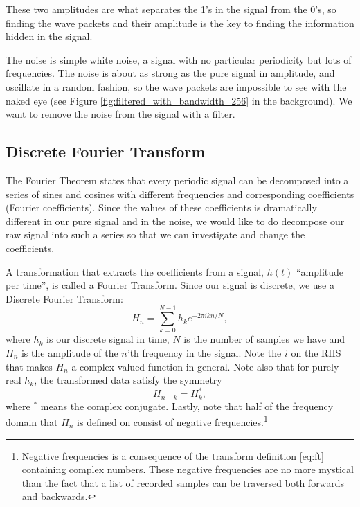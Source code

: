 \documentclass[12pt,a4paper]{article}
\begin{document}
These two amplitudes are what separates the 1's in the signal from the 0's,
so finding the wave packets and their amplitude is the key to finding the
information hidden in the signal.

The noise is simple white noise, a signal with no particular periodicity but lots of frequencies.
The noise is about as strong as the pure signal in amplitude, and oscillate in a random fashion, so the wave packets
are impossible to see with the naked eye (see Figure \ref{fig:filtered_with_bandwidth_256} in the background).
We want to remove the noise from the signal with a filter.

\subsection{Discrete Fourier Transform}\label{sec:ft}
The Fourier Theorem states that every periodic signal can be decomposed into
a series of sines and cosines with different frequencies and corresponding coefficients (Fourier coefficients).
Since the values of these coefficients%
is dramatically different in our pure signal and in the noise,
we would like to do decompose our raw signal into such a series so that we can
investigate and change the coefficients.

A transformation that extracts the coefficients from a signal, $h(t)$ ``amplitude per time'',
is called a Fourier Transform. Since our signal is discrete, we use a Discrete Fourier
Transform:
\begin{equation}\label{eq:ft}
  H_n = \sum_{k=0}^{N-1} h_ke^{-2\pi ikn/N},
\end{equation}
where $h_k$ is our discrete signal in time, $N$ is the number of samples we have and
$H_n$ is the amplitude of the $n$'th frequency in the signal.
Note the $i$ on the RHS that makes $H_n$ a complex valued function in general.
Note also that for purely real $h_k$, the transformed data satisfy the symmetry
\begin{equation}\label{eq:symmetry}
  H_{n-k} = H_k^*,
\end{equation}
where $^*$ means the complex conjugate.
Lastly, note that half of the frequency domain that $H_n$ is defined on
consist of negative frequencies.\footnote{Negative frequencies is a
consequence of the transform definition \eqref{eq:ft} containing complex numbers.
These negative frequencies are no more
mystical than the fact that a list of recorded samples can be traversed both
forwards and backwards.}
\end{document}
